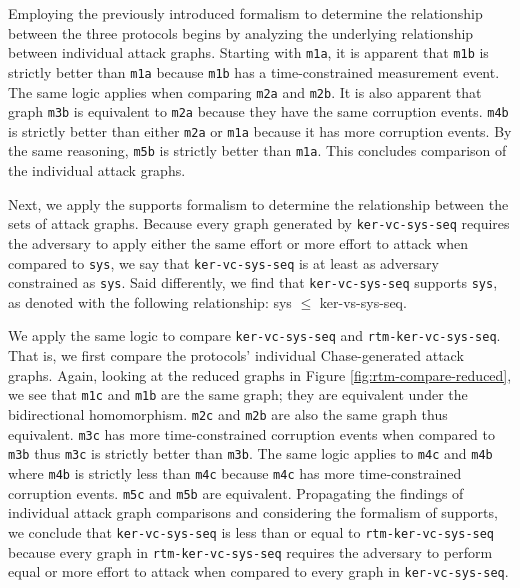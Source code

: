 \documentclass[runningheads]{llncs}
\theoremstyle{definition}
\begin{document}
Employing the previously introduced formalism to determine the relationship between the three protocols begins by analyzing the underlying relationship between individual attack graphs. Starting with \texttt{m1a}, it is apparent that \texttt{m1b} is strictly better than \texttt{m1a} because \texttt{m1b} has a time-constrained measurement event. The same logic applies when comparing \texttt{m2a} and \texttt{m2b}. It is also apparent that graph \texttt{m3b} is equivalent to \texttt{m2a} because they have the same corruption events. \texttt{m4b} is strictly better than either \texttt{m2a} or \texttt{m1a} because it has more corruption events. By the same reasoning, \texttt{m5b} is strictly better than \texttt{m1a}. This concludes comparison of the individual attack graphs.

Next, we apply the supports formalism to determine the relationship between the sets of attack graphs. Because every graph generated by \texttt{ker-vc-sys-seq} requires the adversary to apply either the same effort or more effort to attack when compared to \texttt{sys}, we say that \texttt{ker-vc-sys-seq} is at least as adversary constrained as \texttt{sys}. Said differently, we find that \texttt{ker-vc-sys-seq} supports \texttt{sys}, as denoted with the following relationship: sys $\leq$ ker-vs-sys-seq.

We apply the same logic to compare \texttt{ker-vc-sys-seq} and \texttt{rtm-ker-vc-sys-seq}. That is, we first compare the protocols' individual Chase-generated attack graphs. Again, looking at the reduced graphs in Figure \ref{fig:rtm-compare-reduced}, we see that  \texttt{m1c} and  \texttt{m1b} are the same graph; they are equivalent under the bidirectional homomorphism. \texttt{m2c} and \texttt{m2b} are also the same graph thus equivalent. \texttt{m3c} has more time-constrained corruption events when compared to  \texttt{m3b} thus  \texttt{m3c} is strictly better than \texttt{m3b}. The same logic applies to \texttt{m4c} and  \texttt{m4b} where  \texttt{m4b} is strictly less than  \texttt{m4c} because  \texttt{m4c} has more time-constrained corruption events.  \texttt{m5c} and \texttt{m5b} are equivalent. Propagating the findings of individual attack graph comparisons and considering the formalism of supports, we conclude that \texttt{ker-vc-sys-seq} is less than or equal to \texttt{rtm-ker-vc-sys-seq} because every graph in \texttt{rtm-ker-vc-sys-seq} requires the adversary to perform equal or more effort to attack when compared to every graph in  \texttt{ker-vc-sys-seq}. 
\end{document}
